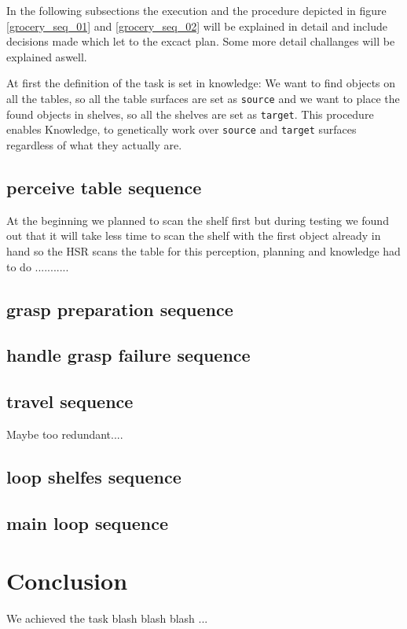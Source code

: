 \documentclass[main.tex]{subfiles}
\begin{document}
	In the following subsections the execution and the procedure depicted in figure \ref{grocery_seq_01} and \ref{grocery_seq_02} will be explained in detail and include decisions made which let to the excact plan. Some more detail challanges will be explained aswell.

	At first the definition of the task is set in knowledge: We want to find objects on all the tables, so all the table surfaces are set as \texttt{source} and we want to place the found objects in shelves, so all the shelves are set as \texttt{target}. This procedure enables Knowledge, to genetically work over \texttt{source} and \texttt{target} surfaces regardless of what they actually are.
	
	
	
	
	
	
	
	
	
	
	
	
	
	

	\subsection{perceive table sequence}
	At the beginning we planned to scan the shelf first but during testing we found out that it will take less time to scan the shelf with the first object already in hand so the HSR scans the table for this perception, planning and knowledge had to do ...........

	\subsection{grasp preparation sequence}
	\subsection{handle grasp failure sequence}
	\subsection{travel sequence}
	Maybe too redundant....
	\subsection{loop shelfes sequence}
	\subsection{main loop sequence}
	
	\section{Conclusion}

	We achieved the task blash blash blash ...
	
	
	\endgroup
	
\end{document}
